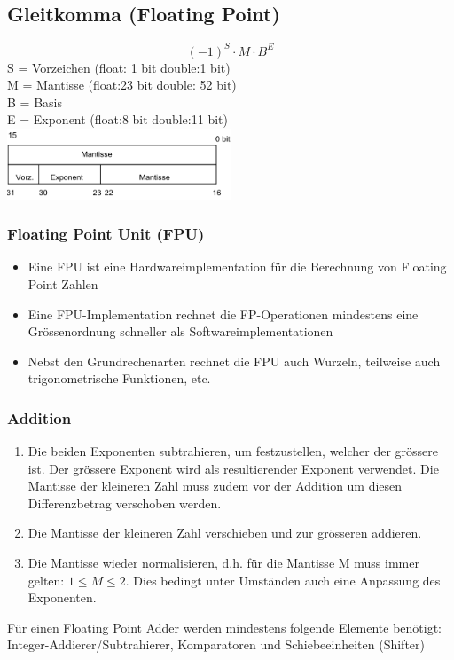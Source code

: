\subsection{Gleitkomma (Floating Point)}
\begin{multicols}{2}
	\begin{equation}
	(-1)^S\cdot M \cdot B^E
	\end{equation}
	S = Vorzeichen (float: 1 bit double:1 bit)\\
	M = Mantisse (float:23 bit double: 52 bit)\\
	B = Basis \\
	E = Exponent (float:8 bit double:11 bit)\\
\columnbreak
	\includegraphics[width=0.5\textwidth]{images/Arithmetik/floating_point}
\end{multicols}

\subsubsection{Floating Point Unit (FPU)}
\begin{itemize}
	\item Eine FPU ist eine Hardwareimplementation für die Berechnung von Floating Point Zahlen
	\item Eine FPU-Implementation rechnet die FP-Operationen mindestens eine Grössenordnung schneller als Softwareimplementationen
	\item Nebst den Grundrechenarten rechnet die FPU auch Wurzeln, teilweise auch trigonometrische Funktionen, etc.
\end{itemize}

\subsubsection{Addition}
\begin{enumerate}
	\item Die beiden Exponenten subtrahieren, um festzustellen, welcher der grössere ist. Der grössere Exponent wird als resultierender Exponent verwendet. Die Mantisse der kleineren Zahl muss zudem vor der Addition um diesen Differenzbetrag verschoben werden. 
	\item Die Mantisse der kleineren Zahl verschieben und zur grösseren addieren. 
	\item Die Mantisse wieder normalisieren, d.h. für die Mantisse M muss immer gelten: $1 \leq M \leq 2$. Dies bedingt unter Umständen auch eine Anpassung des Exponenten.	
\end{enumerate}
Für einen Floating Point Adder werden mindestens folgende Elemente benötigt: Integer-Addierer/Subtrahierer, Komparatoren und Schiebeeinheiten (Shifter)

